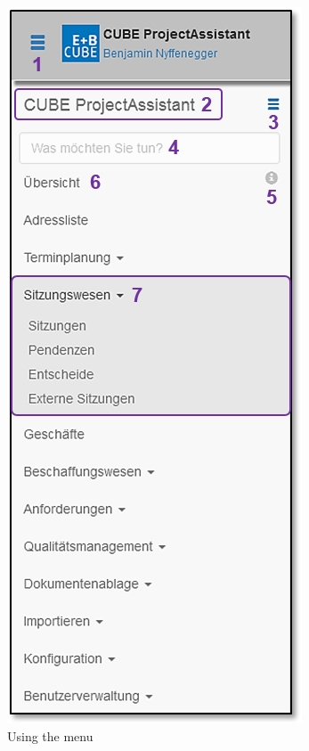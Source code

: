 \begin{figure}
\begin{center}
    \includegraphics[width=1\linewidth]{../chapters/02_GettingStarted/pictures/2-5-1_Menu_Uebersicht.jpg}
  \end{center}
  \vspace{-20pt}
  \caption{Using the menu}
  \vspace{-10pt}
\end{figure}

